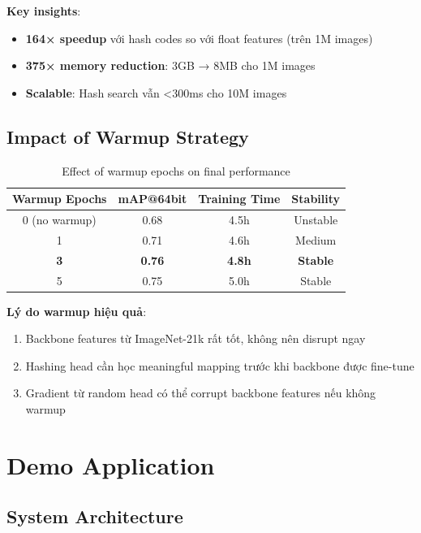 \documentclass[12pt,a4paper]{article}
\begin{document}
\textbf{Key insights}:
\begin{itemize}
    \item \textbf{164× speedup} với hash codes so với float features (trên 1M images)
    \item \textbf{375× memory reduction}: 3GB → 8MB cho 1M images
    \item \textbf{Scalable}: Hash search vẫn <300ms cho 10M images
\end{itemize}

\subsection{Impact of Warmup Strategy}

\begin{table}[H]
\centering
\caption{Effect of warmup epochs on final performance}
\begin{tabular}{c|ccc}
\toprule
\textbf{Warmup Epochs} & \textbf{mAP@64bit} & \textbf{Training Time} & \textbf{Stability} \\
\midrule
0 (no warmup) & 0.68 & 4.5h & Unstable \\
1 & 0.71 & 4.6h & Medium \\
\textbf{3} & \textbf{0.76} & \textbf{4.8h} & \textbf{Stable} \\
5 & 0.75 & 5.0h & Stable \\
\bottomrule
\end{tabular}
\end{table}

\textbf{Lý do warmup hiệu quả}:
\begin{enumerate}
    \item Backbone features từ ImageNet-21k rất tốt, không nên disrupt ngay
    \item Hashing head cần học meaningful mapping trước khi backbone được fine-tune
    \item Gradient từ random head có thể corrupt backbone features nếu không warmup
\end{enumerate}

\section{Demo Application}

\subsection{System Architecture}
\end{document}
